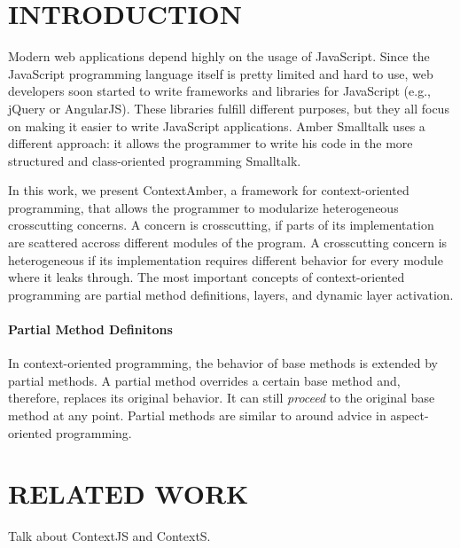\documentclass{sig-alternate}
\begin{document}



\section{INTRODUCTION}
Modern web applications depend highly on the usage of JavaScript. Since the JavaScript programming language itself is pretty limited and hard to use, web developers soon started to write frameworks and libraries for JavaScript (e.g., jQuery or AngularJS). These libraries fulfill different purposes, but they all focus on making it easier to write JavaScript applications. Amber Smalltalk uses a different approach: it allows the programmer to write his code in the more structured and class-oriented programming Smalltalk.

In this work, we present ContextAmber, a framework for context-oriented programming, that allows the programmer to modularize heterogeneous crosscutting concerns. A concern is crosscutting, if parts of its implementation are scattered accross different modules of the program. A crosscutting concern is heterogeneous if its implementation requires different behavior for every module where it leaks through. The most important concepts of context-oriented programming are partial method definitions, layers, and dynamic layer activation.

\paragraph{Partial Method Definitons}
In context-oriented programming, the behavior of base methods is extended by partial methods. A partial method overrides a certain base method and, therefore, replaces its original behavior. It can still \emph{proceed} to the original base method at any point. Partial methods are similar to around advice in aspect-oriented programming.

\section{RELATED WORK}
Talk about ContextJS and ContextS.
\end{document}
